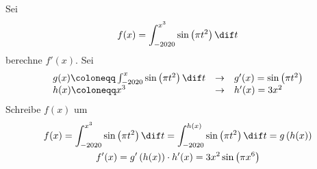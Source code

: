 \begin{example}
	Sei 
	\begin{equation*}
		f(x) = \int_{-2020}^{x^3} \sin \left( \pi t^2 \right) \dif t
	\end{equation*}
	berechne $f'(x)$.
	\tcblower
	Sei
	\begin{equation*}
		\begin{array}{lcl}
			g(x) \coloneqq \int_{-2020}^{x} \sin \left( \pi t^2 \right) \dif t & \to & g'(x) = \sin \left( \pi t^2\right)\\
			h(x) \coloneqq x^3 & \to & h'(x) = 3x^2
		\end{array}
	\end{equation*}
	Schreibe $f(x)$ um
	\begin{gather*}
		f(x) = \int_{-2020}^{x^3} \sin \left( \pi t^2 \right) \dif t = \int_{-2020}^{h(x)} \sin \left( \pi t^2
		\right) \dif t = g \left( h(x) \right)\\
		f'(x) = g' \left( h(x) \right) \cdot h'(x) = 3x^2 \sin \left( \pi x^6 \right)
	\end{gather*}
\end{example}